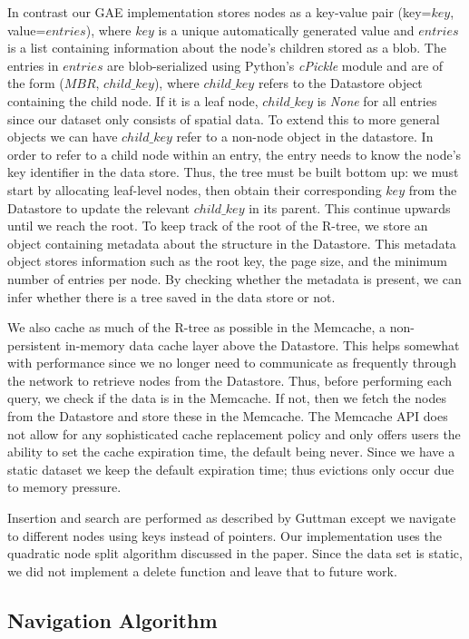 \documentclass{scrartcl}
\begin{document}
In contrast our GAE implementation stores nodes as a key-value pair (key=$key$, value=$entries$), where $key$ is a unique automatically generated value and $entries$ is a list containing information about the node's children stored as a blob. The entries in $entries$ are blob-serialized using Python's \textit{cPickle} module and are of the form ($MBR$, $child\_key$), where $child\_key$ refers to the Datastore object containing the child node. If it is a leaf node, $child\_key$ is \textit{None} for all entries since our dataset only consists of spatial data. To extend this to more general objects we can have $child\_key$ refer to a non-node object in the datastore. In order to refer to a child node within an entry, the entry needs to know the node's key identifier in the data store. Thus, the tree must be built bottom up: we must start by allocating leaf-level nodes, then obtain their corresponding $key$ from the Datastore to update the relevant $child\_key$ in its parent. This continue upwards until we reach the root. To keep track of the root of the R-tree, we store an object containing metadata about the structure in the Datastore. This metadata object stores information such as the root key, the page size, and the minimum number of entries per node. By checking whether the metadata is present, we can infer whether there is a tree saved in the data store or not.

We also cache as much of the R-tree as possible in the Memcache, a non-persistent in-memory data cache layer above the Datastore. This helps somewhat with performance since we no longer need to communicate as frequently through the network to retrieve nodes from the Datastore. Thus, before performing each query, we check if the data is in the Memcache. If not, then we fetch the nodes from the Datastore and store these in the Memcache. The Memcache API does not allow for any sophisticated cache replacement policy and only offers users the ability to set the cache expiration time, the default being never. Since we have a static dataset we keep the default expiration time; thus evictions only occur due to memory pressure.

Insertion and search are performed as described by Guttman\cite{DBLP:conf/sigmod/Guttman84} except we navigate to different nodes using keys instead of pointers. Our implementation uses the quadratic node split algorithm discussed in the paper. Since the data set is static, we did not implement a delete function and leave that to future work.

\subsection{Navigation Algorithm}

\end{document}
